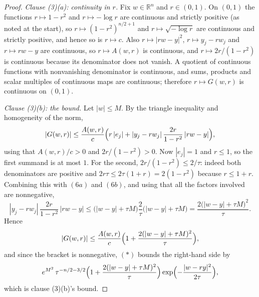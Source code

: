 \begin{proof}
\emph{Clause (3)(a): continuity in $r$.}  Fix $w \in \mathbb{R}^n$ and
$r \in (0,1)$.  On $(0,1)$ the functions $r \mapsto 1-r^2$ and
$r \mapsto -\log r$ are continuous and strictly positive (as noted at the
start), so $r \mapsto (1-r^2)^{n/2+1}$ and $r \mapsto \sqrt{-\log r}$ are
continuous and strictly positive, and hence so is $r \mapsto c$.  Also
$r \mapsto |rw-y|^2$, $r \mapsto y_j - r w_j$ and $r \mapsto rw-y$ are
continuous, so $r \mapsto A(w,r)$ is continuous, and $r \mapsto 2r/(1-r^2)$ is
continuous because its denominator does not vanish.  A quotient of continuous
functions with nonvanishing denominator is continuous, and sums, products and
scalar multiples of continuous maps are continuous; therefore
$r \mapsto G(w,r)$ is continuous on $(0,1)$.

\emph{Clause (3)(b): the bound.}  Let $|w| \leq M$.  By the triangle inequality
and homogeneity of the norm,
\[
  |G(w,r)| \leq \frac{A(w,r)}{c}
    \Bigl(r\,|e_j| + |y_j - r w_j|\,\frac{2r}{1-r^2}\,|rw-y|\Bigr) ,
\]
using that $A(w,r)/c > 0$ and $2r/(1-r^2) > 0$.  Now $|e_j| = 1$ and $r \leq 1$,
so the first summand is at most $1$.  For the second, $2r/(1-r^2) \leq 2/\tau$:
indeed both denominators are positive and
$2r\tau \leq 2\tau(1+r) = 2(1-r^2)$ because $r \leq 1+r$.  Combining this with
$(6a)$ and $(6b)$, and using that all the factors involved are nonnegative,
\[
  |y_j - r w_j|\,\frac{2r}{1-r^2}\,|rw-y|
    \leq \bigl(|w-y| + \tau M\bigr)\frac{2}{\tau}\bigl(|w-y| + \tau M\bigr)
    = \frac{2\bigl(|w-y| + \tau M\bigr)^2}{\tau} .
\]
Hence
\[
  |G(w,r)| \leq \frac{A(w,r)}{c}
    \Bigl(1 + \frac{2(|w-y| + \tau M)^2}{\tau}\Bigr) ,
\]
and since the bracket is nonnegative, $(\ast)$ bounds the right-hand side by
\[
  e^{M^2}\,\tau^{-n/2-3/2}
    \Bigl(1 + \frac{2(|w-y| + \tau M)^2}{\tau}\Bigr)
    \exp\Bigl(-\frac{|w-ry|^2}{2\tau}\Bigr) ,
\]
which is clause (3)(b)'s bound.
\end{proof}
